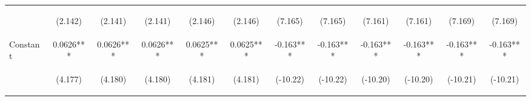 \documentclass[]{article}
\begin{document}
\begin{center}
\begin{tabular}{lccccccccccc}
\vspace{4pt} & \begin{footnotesize}(2.142)\end{footnotesize} & \begin{footnotesize}(2.141)\end{footnotesize} & \begin{footnotesize}(2.141)\end{footnotesize} & \begin{footnotesize}(2.146)\end{footnotesize} & \begin{footnotesize}(2.146)\end{footnotesize} & \begin{footnotesize}(7.165)\end{footnotesize} & \begin{footnotesize}(7.165)\end{footnotesize} & \begin{footnotesize}(7.161)\end{footnotesize} & \begin{footnotesize}(7.161)\end{footnotesize} & \begin{footnotesize}(7.169)\end{footnotesize} & \begin{footnotesize}(7.169)\end{footnotesize} \\
Constant & 0.0626*** & 0.0626*** & 0.0626*** & 0.0625*** & 0.0625*** & -0.163*** & -0.163*** & -0.163*** & -0.163*** & -0.163*** & -0.163*** \\
 & \begin{footnotesize}(4.177)\end{footnotesize} & \begin{footnotesize}(4.180)\end{footnotesize} & \begin{footnotesize}(4.180)\end{footnotesize} & \begin{footnotesize}(4.181)\end{footnotesize} & \begin{footnotesize}(4.181)\end{footnotesize} & \begin{footnotesize}(-10.22)\end{footnotesize} & \begin{footnotesize}(-10.22)\end{footnotesize} & \begin{footnotesize}(-10.20)\end{footnotesize} & \begin{footnotesize}(-10.20)\end{footnotesize} & \begin{footnotesize}(-10.21)\end{footnotesize} & \begin{footnotesize}(-10.21)\end{footnotesize} \\

\end{tabular}
\end{center}
\end{document}
